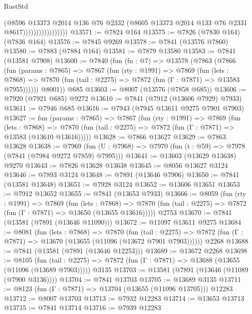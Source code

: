 \begin{lexlean}{RustStd}
\begin{coremodule}
                                  (@8596
                                    @13373
                                    @2014
                                    @136
                                    @76
                                    @2332
                                    (@8605 @13373 @2014 @133 @76 @2331 @8617)))))))))))))))))
@13571 := @7824 @164
@13575 := @7826 (@7830 @164) (@7836 @164)
@13576 := @7845 @9269
@13578 := @7841 (@13576 @7860)
@13580 := @7883 (@7884 @164)
@13581 := @7879 @13580
@13583 := @7841 (@13581 @7908)
@13600 := @7840
    (fun (fn : @7) =>
    @13578
      (@7863
        (@7866
          (fun (params : @7865) =>
          @7867
            (fun (rty : @1991) =>
            @7869
              (fun (lets : @7868) =>
              @7870 (fun (tail : @2275) => @7872 (fun (Γ : @7871) => @13583 @7955))))))
        @8001))
    @685
@13603 := @8007 (@13576 (@7858 @685))
@13606 := @7920 (@7921 @685) @9272
@13610 := @7841 (@7912 (@13606 @7929) @7933)
@13611 := @7946 @685
@13616 := @7943 (@7945 @13611 @9275 @7901 @7903)
@13627 := fun (params : @7865) =>
  @7867
    (fun (rty : @1991) =>
    @7869
      (fun (lets : @7868) =>
      @7870 (fun (tail : @2275) => @7872 (fun (Γ : @7871) => @13583 (@13610 @13616)))))
@13628 := @7866 @13627
@13629 := @7863 @13628
@13638 := @7969
    (fun (U : @7968) => @7970 (fun (t : @59) => @7978 (@7841 (@7984 @9272 @7859) @7995)))
@13641 := @13603 (@13629 @13638) @9270
@13643 := @7826 @13628 @13638
@13645 := @8056 @13627 @3124
@13646 := @7893 @3124
@13648 := @7891 (@13646 @7906)
@13650 := @7841 (@13581 @13648)
@13651 := @7928 @3124
@13652 := @13606 @13651
@13653 := @7912 @13652
@13655 := @7841 (@13653 @7933)
@13666 := @8059
    (fun (rty : @1991) =>
    @7869
      (fun (lets : @7868) =>
      @7870 (fun (tail : @2275) => @7872 (fun (Γ : @7871) => @13650 (@13655 @13616)))))
    @2753
@13670 := @7841 (@13581 (@7891 (@13646 @11090)))
@13672 := @11097 @13611 @9275
@13684 := @8081
    (fun (lets : @7868) =>
    @7870
      (fun (tail : @2275) =>
      @7872 (fun (Γ : @7871) => @13670 (@13655 (@11096 (@13672 @7901 @7903))))))
    @2268
@13688 := @7841 (@13581 (@7891 (@13646 @12253)))
@13689 := @13672 @2268
@13698 := @8105
    (fun (tail : @2275) => @7872 (fun (Γ : @7871) => @13688 (@13655 (@11096 (@13689 @7903)))))
    @3135
@13703 := @13581 (@7891 (@13646 (@11089 (@7900 @3136))))
@13704 := @7841 @13703
@13705 := @13689 @3135
@13711 := @8123 (fun (Γ : @7871) => @13704 (@13655 (@11096 @13705))) @12283
@13712 := @8007 @13703
@13713 := @7932 @12283
@13714 := @13653 @13713
@13715 := @7841 @13714
@13716 := @7939 @12283

\end{coremodule}
\end{lexlean}
